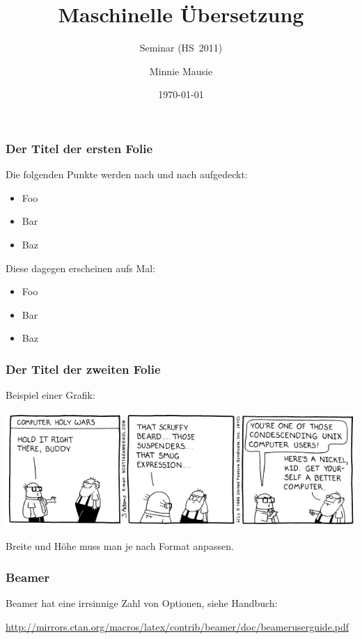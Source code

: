 \documentclass{clsemhs11-beamer}
\title{Maschinelle \"Ubersetzung}
\subtitle{Seminar \q{Maschinelle \"Ubersetzung} (HS~2011)}
\author{Minnie Mausie}
\date{\today}
\begin{document}
  \maketitle

\begin{frame}
  \frametitle{Der Titel der ersten Folie}

  Die folgenden Punkte werden nach und nach aufgedeckt:
  
  \begin{itemize}[<+->]
  \item Foo
  \item Bar
  \item Baz
  \end{itemize}

  Diese dagegen erscheinen aufs Mal:

  \begin{itemize}
  \item Foo
  \item Bar
  \item Baz
  \end{itemize}
\end{frame}

\begin{frame}
  \frametitle{Der Titel der zweiten Folie}

  Beispiel einer Grafik:

  \includegraphics[width=\textwidth]{graphics/dilbert-unix}

  Breite und Höhe muss man je nach Format anpassen.
\end{frame}

\begin{frame}
  \frametitle{Beamer}

  Beamer hat eine irrsinnige Zahl von Optionen, siehe Handbuch:

  \url{http://mirrors.ctan.org/macros/latex/contrib/beamer/doc/beameruserguide.pdf}
\end{frame}
\end{document}
